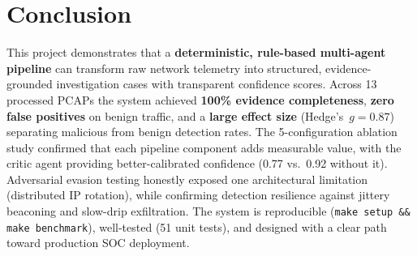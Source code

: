 \documentclass[11pt, a4paper]{article}
\begin{document}
\section{Conclusion}

This project demonstrates that a \textbf{deterministic, rule-based multi-agent pipeline}
can transform raw network telemetry into structured, evidence-grounded investigation
cases with transparent confidence scores. Across 13 processed PCAPs the system achieved
\textbf{100\% evidence completeness}, \textbf{zero false positives} on benign traffic,
and a \textbf{large effect size} (Hedge's~$g = 0.87$) separating malicious from benign
detection rates. The 5-configuration ablation study confirmed that each pipeline
component adds measurable value, with the critic agent providing better-calibrated
confidence (0.77 vs.\ 0.92 without it). Adversarial evasion testing honestly exposed
one architectural limitation (distributed IP rotation), while confirming detection
resilience against jittery beaconing and slow-drip exfiltration. The system is
reproducible (\texttt{make setup \&\& make benchmark}), well-tested (51 unit tests),
and designed with a clear path toward production SOC deployment.
\end{document}
